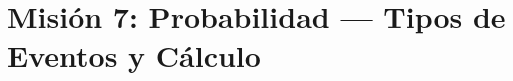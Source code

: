 \documentclass[12pt, letterpaper]{article}
\newcommand{\boxfill}[1][1.5cm]{\tcbox[on line, size=minimal,
	colframe=valdark!60, colback=boxbg, boxrule=0.8pt, arc=1mm,
	boxsep=3pt, left=2pt, right=2pt, top=2pt, bottom=2pt]%
	{\makebox[#1]{\vphantom{M}}}}
\newcommand{\boxstep}[1][2cm]{\tcbox[on line, size=minimal,
	colframe=valdark!40, colback=white, boxrule=0.8pt, arc=1mm,
	boxsep=3pt, left=2pt, right=2pt, top=2pt, bottom=2pt]%
	{\makebox[#1]{\vphantom{M}}}}
\begin{document}

	\newpage
	\section*{Misión 7: Probabilidad — Tipos de Eventos y Cálculo}
	
\end{document}
